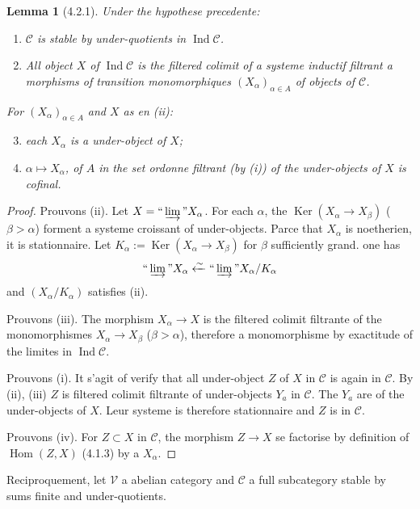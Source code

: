 \documentclass[12pt,a4paper]{article}
\theoremstyle{plain}
\newtheorem{lemma}[theorem]{Lemma}
\theoremstyle{definition}
\theoremstyle{remark}
\DeclareMathOperator{\Ker}{Ker}
\DeclareMathOperator{\Hom}{Hom}
\DeclareMathOperator{\Ind}{Ind}
\begin{document}
\begin{lemma}[4.2.1]\label{lem:4.2.1}
Under the hypothese precedente:
\begin{enumerate}[label=(\roman*)]
\item $\mathcal{C}$ is stable by under-quotients in $\Ind\mathcal{C}$.
\item All object $X$ of $\Ind\mathcal{C}$ is the filtered colimit of a systeme inductif filtrant a morphisms of transition monomorphiques $(X_\alpha)_{\alpha 
\in A}$ of objects of $\mathcal{C}$.
\end{enumerate}
For $(X_\alpha)_{\alpha 
\in A}$ and $X$ as en (ii):
\begin{enumerate}[label=(\roman*)]
\setcounter{enumi}{2}
\item each $X_\alpha$ is a under-object of $X$;
\item $\alpha 
\mapsto X_\alpha$, of $A$ in the set ordonne filtrant (by (i)) of the under-objects of $X$ is cofinal.
\end{enumerate}
\end{lemma}

\begin{proof}
Prouvons (ii). Let $X = 
\text{``}
\varinjlim
\text{''} X_\alpha$. For each $\alpha$, the $\Ker(X_\alpha 
\to X_\beta)$ ($\beta > 
\alpha$) forment a systeme croissant of under-objects. Parce that $X_\alpha$ is noetherien, it is stationnaire. Let $K_\alpha := 
\Ker(X_\alpha 
\to X_\beta)$ for $\beta$ sufficiently grand. one has
\[
\text{``}
\varinjlim
\text{''} X_\alpha 
\xleftarrow{
\sim} 
\text{``}
\varinjlim
\text{''} X_\alpha/K_\alpha
\]
and $(X_\alpha/K_\alpha)$ satisfies (ii).

Prouvons (iii). The morphism $X_\alpha 
\to X$ is the filtered colimit filtrante of the monomorphismes $X_\alpha 
\to X_\beta$ ($\beta > 
\alpha$), therefore a monomorphisme by exactitude of the limites in $\Ind\mathcal{C}$.

Prouvons (i). It s'agit of verify that all under-object $Z$ of $X$ in $\mathcal{C}$ is again in $\mathcal{C}$. By (ii), (iii) $Z$ is filtered colimit filtrante of under-objects $Y_a$ in $\mathcal{C}$. The $Y_a$ are of the under-objects of $X$. Leur systeme is therefore stationnaire and $Z$ is in $\mathcal{C}$.

Prouvons (iv). For $Z 
\subset X$ in $\mathcal{C}$, the morphism $Z 
\to X$ se factorise by definition of $\Hom(Z,X)$ (4.1.3) by a $X_\alpha$.
\end{proof}

Reciproquement, let $\mathcal{V}$ a abelian category and $\mathcal{C}$ a full subcategory stable by sums finite and under-quotients.
\end{document}
